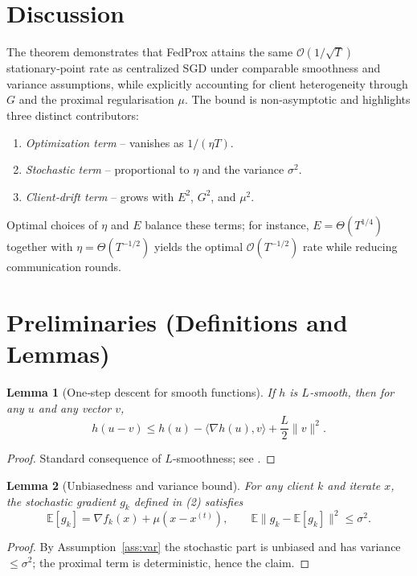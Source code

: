 \documentclass[11pt]{article}
\newtheorem{lemma}{Lemma}
\newcommand{\E}{\mathbb{E}}
\begin{document}
\section*{Discussion}
The theorem demonstrates that FedProx attains the same $\mathcal{O}(1/\sqrt{T})$ stationary‑point rate as centralized SGD under comparable smoothness and variance assumptions, while explicitly accounting for client heterogeneity through $G$ and the proximal regularisation $\mu$. The bound is non‑asymptotic and highlights three distinct contributors:
\begin{enumerate}
\item \emph{Optimization term} – vanishes as $1/(\eta T)$.
\item \emph{Stochastic term} – proportional to $\eta$ and the variance $\sigma^2$.
\item \emph{Client‑drift term} – grows with $E^2$, $G^2$, and $\mu^2$.
\end{enumerate}
Optimal choices of $\eta$ and $E$ balance these terms; for instance, $E = \Theta(T^{1/4})$ together with $\eta=\Theta(T^{-1/2})$ yields the optimal $\mathcal{O}(T^{-1/2})$ rate while reducing communication rounds.

\section*{Preliminaries (Definitions and Lemmas)}
\begin{lemma}[One‑step descent for smooth functions]\label{lem:descent}
If $h$ is $L$‑smooth, then for any $u$ and any vector $v$,
\[
h(u-v)\le h(u)-\langle\nabla h(u),v\rangle+\frac{L}{2}\|v\|^2 .
\]
\end{lemma}
\begin{proof}
Standard consequence of $L$‑smoothness; see \cite{nesterov2004introductory}.
\end{proof}

\begin{lemma}[Unbiasedness and variance bound]\label{lem:unbiased}
For any client $k$ and iterate $x$, the stochastic gradient $g_k$ defined in (2) satisfies
\[
\E[g_k]=\nabla f_k(x)+\mu(x-x^{(t)}),
\qquad
\E\|g_k-\E[g_k]\|^2\le\sigma^2 .
\]
\end{lemma}
\begin{proof}
By Assumption~\ref{ass:var} the stochastic part is unbiased and has variance $\le\sigma^2$; the proximal term is deterministic, hence the claim.
\end{proof}
\end{document}
